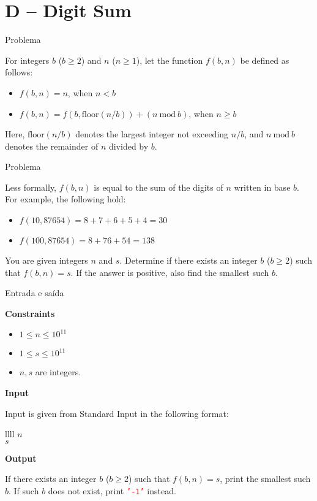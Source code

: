\section{D -- Digit Sum}

\begin{frame}[fragile]{Problema}

For integers $b$ ($b \geq 2$) and $n$ ($n \geq 1$), let the function $f(b, n)$ be defined as
follows:
\begin{itemize}
    \item $f(b, n) = n$, when $n < b$
    \item $f(b, n) = f(b, \mbox{floor}(n/b)) + (n\ \mbox{mod}\ b)$, when $n\geq b$
\end{itemize}

Here, $\mbox{floor}(n/b)$ denotes the largest integer not exceeding $n/b$, and $n\ \mbox{mod}\ b$
denotes the remainder of $n$ divided by $b$.

\end{frame}


\begin{frame}[fragile]{Problema}

Less formally, $f(b, n)$ is equal to the sum of the digits of $n$ written in base $b$. For example,
the following hold:
\begin{itemize}
    \item $f(10, 87654) = 8 + 7 + 6 + 5 + 4 = 30$
    \item $f(100, 87654) = 8 + 76 + 54 = 138$
\end{itemize}

You are given integers $n$ and $s$. Determine if there exists an integer $b$ ($b\geq 2$) such that 
$f(b, n) = s$. If the answer is positive, also find the smallest such $b$.

\end{frame}

\begin{frame}[fragile]{Entrada e saída}

\textbf{Constraints}

\begin{itemize}
    \item $1\leq n \leq 10^{11}$
    \item $1\leq s \leq 10^{11}$
    \item $n, s$ are integers.
\end{itemize}

\textbf{Input}

Input is given from Standard Input in the following format:
\begin{atcoderio}{llll}
$n$ \\
$s$
\end{atcoderio}

\textbf{Output}

If there exists an integer $b$ ($b\geq 2$) such that $f(b, n) = s$, print the smallest such $b$.
If such $b$ does not exist, print \texttt{\textcolor{red}{'-1'}} instead.

\end{frame}


